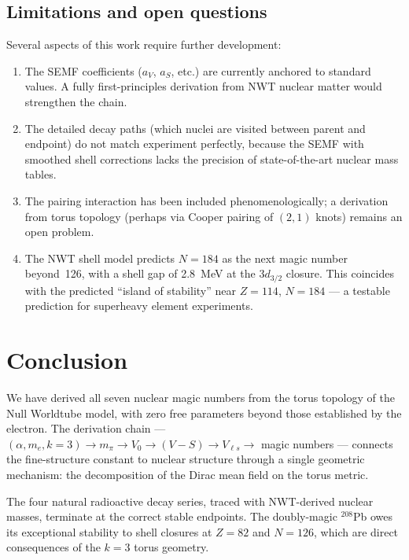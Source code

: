 \documentclass[11pt,a4paper]{article}
\begin{document}
\subsection{Limitations and open questions}

Several aspects of this work require further development:
\begin{enumerate}
  \item The SEMF coefficients ($a_V$, $a_S$, etc.) are currently anchored
        to standard values.  A fully first-principles derivation from NWT
        nuclear matter would strengthen the chain.
  \item The detailed decay paths (which nuclei are visited between parent
        and endpoint) do not match experiment perfectly, because the SEMF
        with smoothed shell corrections lacks the precision of
        state-of-the-art nuclear mass tables.
  \item The pairing interaction has been included phenomenologically;
        a derivation from torus topology (perhaps via Cooper pairing of
        $(2,1)$ knots) remains an open problem.
  \item The NWT shell model predicts $N = 184$ as the next magic number
        beyond~126, with a shell gap of 2.8~MeV at the $3d_{3/2}$ closure.
        This coincides with the predicted ``island of stability'' near
        $Z = 114$, $N = 184$ --- a testable prediction for superheavy
        element experiments.
\end{enumerate}


\section{Conclusion}
\label{sec:conclusion}

We have derived all seven nuclear magic numbers from the torus topology
of the Null Worldtube model, with zero free parameters beyond those
established by the electron.  The derivation chain ---
$(\alpha, m_e, k{=}3) \to m_\pi \to V_0 \to (V{-}S) \to V_{\ell s} \to$
magic numbers --- connects the fine-structure constant to nuclear structure
through a single geometric mechanism: the decomposition of the Dirac mean
field on the torus metric.

The four natural radioactive decay series, traced with NWT-derived nuclear
masses, terminate at the correct stable endpoints.  The doubly-magic
${}^{208}$Pb owes its exceptional stability to shell closures at $Z = 82$
and $N = 126$, which are direct consequences of the $k = 3$ torus geometry.
\end{document}

